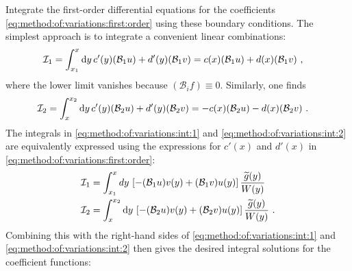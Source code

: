 \begin{subappendices}
Integrate the first-order differential equations for the coefficients \eqref{eq:method:of:variations:first:order} using these boundary conditions. The simplest approach is to integrate a convenient linear combinations:
\begin{align}
	\mathcal{I}_1 = 
	\int_{x_1}^x
	\operatorname{d}\mkern-3mu^{}\mkern-1mu{y}\, c'(y)(\mathcal B_1 u) + d'(y) (\mathcal B_1 v)
	&= c(x) (\mathcal B_1 u) + d(x) (\mathcal B_1 v) \ ,
	\label{eq:method:of:variations:int:1}
\end{align}
where the lower limit vanishes because $(\mathcal B_i f) \equiv 0$. Similarly, one finds
\begin{align}
	\mathcal{I}_2 = 
	\int_{x}^{x_2}
	\operatorname{d}\mkern-3mu^{}\mkern-1mu{y}\, c'(y)(\mathcal B_2 u) + d'(y) (\mathcal B_2 v)
	&= -c(x) (\mathcal B_2 u) - d(x) (\mathcal B_2 v) \ .
	\label{eq:method:of:variations:int:2}
\end{align}
The integrals in \eqref{eq:method:of:variations:int:1} and \eqref{eq:method:of:variations:int:2} are equivalently expressed using the expressions for $c'(x)$ and $d'(x)$ in \eqref{eq:method:of:variations:first:order}:
\begin{align}
	\mathcal{I}_1 
	&= 
	\int_{x_1}^x dy \,
	\left[
	- (\mathcal B_1 u) v(y)
	+ (\mathcal B_1 v) u(y)
	\right]
	\frac{
	\widetilde g(y)
	}{W(y)}	
	\\
	\mathcal{I}_2 
	&=
	\int_{x}^{x_2}
	\operatorname{d}\mkern-3mu^{}\mkern-1mu{y}\, 
	\left[  - (\mathcal B_2 u) v(y) 
			+ (\mathcal B_2 v) u(y)
	\right]
	\frac{
	\widetilde g(y)
	}{W(y)} 
	\ .
\end{align}
Combining this with the right-hand sides of \eqref{eq:method:of:variations:int:1} and \eqref{eq:method:of:variations:int:2} then gives the desired integral solutions for the coefficient functions:
\begin{align}

\end{align}
\end{subappendices}
